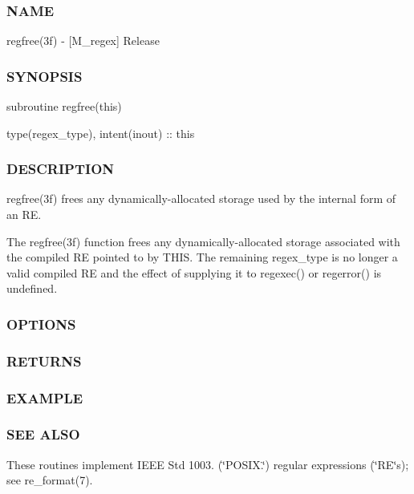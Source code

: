 \subsubsection*{N\+A\+ME}

regfree(3f) -\/ \mbox{[}M\+\_\+regex\mbox{]} Release \subsubsection*{S\+Y\+N\+O\+P\+S\+IS}

subroutine regfree(this)

type(regex\+\_\+type), intent(inout) \+:\+: this

\subsubsection*{D\+E\+S\+C\+R\+I\+P\+T\+I\+ON}

\begin{DoxyVerb}  regfree(3f) frees any dynamically-allocated storage used by the internal form of an RE.

  The regfree(3f) function frees any dynamically-allocated storage associated with the compiled RE pointed to by THIS.  The
  remaining regex_type is no longer a valid compiled RE and the effect of supplying it to regexec() or regerror() is undefined.
\end{DoxyVerb}


\subsubsection*{O\+P\+T\+I\+O\+NS}

\subsubsection*{R\+E\+T\+U\+R\+NS}

\subsubsection*{E\+X\+A\+M\+P\+LE}

\subsubsection*{S\+EE A\+L\+SO}

These routines implement I\+E\+EE Std 1003. (\char`\"{}\+P\+O\+S\+I\+X.\char`\"{}) regular expressions (\char`\"{}\+R\+E\char`\"{}s); see re\+\_\+format(7).

